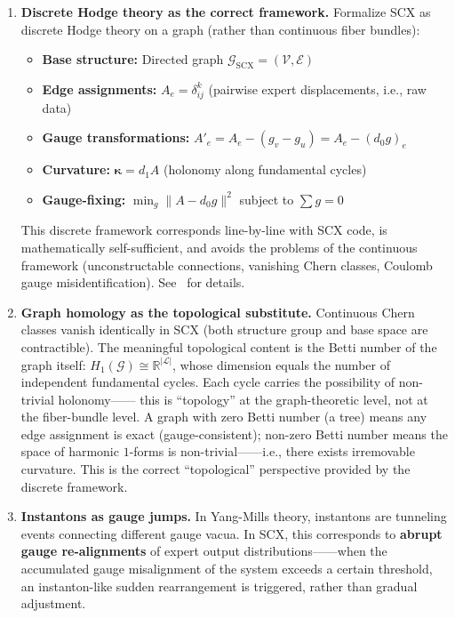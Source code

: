 \documentclass[12pt,a4paper]{article}
\newcommand{\grph}{\mathcal{G}}
\newcommand{\verts}{\mathcal{V}}
\newcommand{\edgs}{\mathcal{E}}
\theoremstyle{remark}
\newcommand{\R}{\mathbb{R}}
\begin{document}
\begin{enumerate}[label=\textbf{(Y\arabic*)}]
    \item \textbf{Discrete Hodge theory as the correct framework.} Formalize SCX as discrete Hodge theory on a graph
    (rather than continuous fiber bundles):
    \begin{itemize}
        \item \textbf{Base structure:} Directed graph $\grph_{\text{SCX}} = (\verts, \edgs)$
        \item \textbf{Edge assignments:} $A_e = \delta_{ij}^k$ (pairwise expert displacements, i.e., raw data)
        \item \textbf{Gauge transformations:} $A'_e = A_e - (g_v - g_u) = A_e - (d_0 g)_e$
        \item \textbf{Curvature:} $\boldsymbol{\kappa} = d_1 A$ (holonomy along fundamental cycles)
        \item \textbf{Gauge-fixing:} $\min_g \|A - d_0 g\|^2$ subject to $\sum g = 0$
    \end{itemize}
    This discrete framework corresponds line-by-line with SCX code, is mathematically self-sufficient, and avoids the problems of the continuous framework
    (unconstructable connections, vanishing Chern classes, Coulomb gauge misidentification).
    See~\cite{scx_fiber_bundle} for details.

    \item \textbf{Graph homology as the topological substitute.} Continuous Chern classes vanish identically in SCX (both structure group and base space are contractible).
    The meaningful topological content is the Betti number of the graph itself: $H_1(\grph) \cong \R^{|\mathcal{L}|}$,
    whose dimension equals the number of independent fundamental cycles. Each cycle carries the possibility of non-trivial holonomy——
    this is ``topology'' at the graph-theoretic level, not at the fiber-bundle level.
    A graph with zero Betti number (a tree) means any edge assignment is exact (gauge-consistent);
    non-zero Betti number means the space of harmonic $1$-forms is non-trivial——i.e., there exists irremovable curvature.
    This is the correct ``topological'' perspective provided by the discrete framework.

    \item \textbf{Instantons as gauge jumps.} In Yang-Mills theory,
    instantons are tunneling events connecting different gauge vacua. In SCX, this corresponds to
    \textbf{abrupt gauge re-alignments} of expert output distributions——when the accumulated gauge misalignment
    of the system exceeds a certain threshold, an instanton-like sudden rearrangement is triggered, rather than gradual adjustment.


\end{enumerate}
\end{document}
